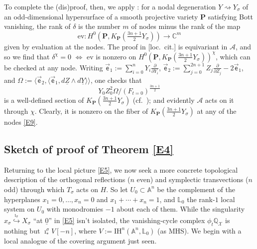 \documentclass[12pt,letterpaper,english]{amsart}
\numberwithin{equation}{section}
\numberwithin{figure}{section}
\theoremstyle{plain}
\theoremstyle{remark}
\theoremstyle{definition}
\theoremstyle{definition}
\theoremstyle{plain}
\theoremstyle{plain}
\theoremstyle{plain}
\theoremstyle{plain}
\theoremstyle{definition}
\def\d{\partial}
\def\uo{\underline{0}}
\def\QQ{\mathbb{Q}}
\def\CC{\mathbb{C}}
\def\X{\mathcal{X}}
\def\A{\mathcal{A}}
\def\IH{\mathrm{IH}}
\def\LL{\mathbb{L}}
\def\UZ{\underline{Z}}
\theoremstyle{definition}
\begin{document}
To complete the (dis)proof, then, we apply \cite[Thm.~2.9]{KL2}: for a nodal degeneration $Y\rightsquigarrow Y_{\sigma}$ of an odd-dimensional hypersurface of a smooth projective variety $\mathbf{P}$ satisfying Bott vanishing, the rank of $\delta$ is the number $m$ of nodes minus the rank of the map $$\mathrm{ev}\colon H^0(\mathbf{P},K_{\mathbf{P}}(\tfrac{3n+1}{2}Y_{\sigma}))\to \CC^m$$ given by evaluation at the nodes. The proof in [loc.~cit.] is equivariant in $\A$, and so we find that $\delta^{\chi}=0$ $\iff$ $\mathrm{ev}$ is nonzero on $H^0(\mathbf{P},K_{\mathbf{P}}(\tfrac{3n+1}{2}Y_{\sigma}))^{\chi}$, which can be checked at any node. Writing $\vec{\mathsf{e}}_1:=\sum_{i=0}^nY_i\tfrac{\d}{\d Y_i}$, $\vec{\mathsf{e}}_2:=\sum_{j=0}^{2n+1}Z_j\tfrac{\d}{\d Z_j}-2\vec{\mathsf{e}}_1$, and $\Omega:=\langle \vec{\mathsf{e}}_2,\langle \vec{\mathsf{e}}_1,d\UZ\wedge d\underline{Y}\rangle\rangle$, one checks that 
\begin{equation}\label{E12}
Y_0Z_0^2\Omega/(F_{t=0})^{\frac{3n+1}{2}}	
\end{equation}
is a well-defined section of $K_{\mathbf{P}}(\tfrac{3n+1}{2}Y_{\sigma})$ (cf.~\cite[\S4.5]{Ke}); and evidently $\A$ acts on it through $\chi$. Clearly, it is nonzero on the fiber of $K_{\mathbf{P}}(\tfrac{3n+1}{2}Y_{\sigma})$ at any of the nodes \eqref{E9}.


\subsection*{Sketch of proof of Theorem \ref{E4}}

Returning to the local picture \eqref{E5}, we now seek a more concrete topological description of the orthogonal reflections ($n$ even) and symplectic transvections ($n$ odd) through which $T_{\sigma}$ acts on $H$. So let $U_0\subset \mathbb{A}^n$ be the complement of the hyperplanes $x_1=0,\ldots,x_n=0$ and $x_1+\cdots +x_n=1$, and $\LL_0$ the rank-$1$ local system on $U_0$ with monodromies $-1$ about each of them. While the singularity $x_{\sigma}\overset{\imath_{\sigma}}{\hookrightarrow}X_{\sigma}$ ``at $\uo$'' in \eqref{E5} isn't isolated, the vanishing-cycle complex $\phi_t\QQ_{\X}$ is nothing but $\imath^{\sigma}_*V[-n]$, where $V:=\IH^n(\mathbb{A}^n,\LL_0)$ (as MHS). We begin with a local analogue of the covering argument just seen.
\end{document}
